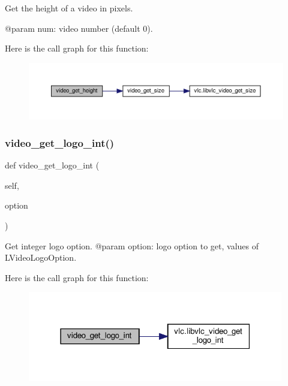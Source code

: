 \begin{DoxyVerb}Get the height of a video in pixels.

@param num: video number (default 0).
\end{DoxyVerb}
 Here is the call graph for this function\+:
\nopagebreak
\begin{figure}[H]
\begin{center}
\leavevmode
\includegraphics[width=350pt]{classvlc_1_1_media_player_a282ff18f2701edbdab0cb4638f9439ea_cgraph}
\end{center}
\end{figure}
\mbox{\label{classvlc_1_1_media_player_ab1dad98d088094f82a72ca5f6981e567}} 
\subsubsection{\texorpdfstring{video\+\_\+get\+\_\+logo\+\_\+int()}{video\_get\_logo\_int()}}
{\footnotesize\ttfamily def video\+\_\+get\+\_\+logo\+\_\+int (\begin{DoxyParamCaption}\item[{}]{self,  }\item[{}]{option }\end{DoxyParamCaption})}

\begin{DoxyVerb}Get integer logo option.
@param option: logo option to get, values of L{VideoLogoOption}.
\end{DoxyVerb}
 Here is the call graph for this function\+:
\nopagebreak
\begin{figure}[H]
\begin{center}
\leavevmode
\includegraphics[width=316pt]{classvlc_1_1_media_player_ab1dad98d088094f82a72ca5f6981e567_cgraph}
\end{center}
\end{figure}
\mbox{\label{classvlc_1_1_media_player_a3b08a7d4454fa62d9c4bb75351b04f71}} 
